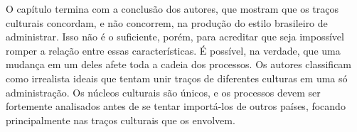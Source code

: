 \documentclass[11pt, a4paper]{article}
\begin{document}
O capítulo termina com a conclusão dos autores, que mostram que os traços culturais concordam, e não concorrem, na produção do estilo brasileiro de administrar. Isso não é o suficiente, porém, para acreditar que seja impossível romper a relação entre essas características. É possível, na verdade, que uma mudança em um deles afete toda a cadeia dos processos. Os autores classificam como irrealista ideais que tentam unir traços de diferentes culturas em uma só administração. Os núcleos culturais são únicos, e os processos devem ser fortemente analisados antes de se tentar importá-los de outros países, focando principalmente nas traços culturais que os envolvem.
\end{document}
